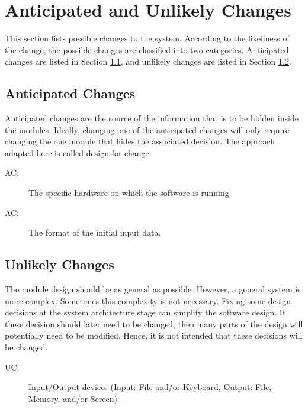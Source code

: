 \documentclass[12pt, titlepage]{article}
\newcounter{acnum}
\newcommand{\actheacnum}{AC\theacnum}
\newcounter{ucnum}
\newcommand{\uctheucnum}{UC\theucnum}
\begin{document}
\section{Anticipated and Unlikely Changes} \label{SecChange}

This section lists possible changes to the system. According to the likeliness
of the change, the possible changes are classified into two
categories. Anticipated changes are listed in Section \ref{SecAchange}, and
unlikely changes are listed in Section \ref{SecUchange}.

\subsection{Anticipated Changes} \label{SecAchange}

Anticipated changes are the source of the information that is to be hidden
inside the modules. Ideally, changing one of the anticipated changes will only
require changing the one module that hides the associated decision. The approach
adapted here is called design for
change.

\begin{description}
  \item[ \actheacnum \label{acHardware}:] The specific
    hardware on which the software is running.
  \item[ \actheacnum \label{acInput}:] The format of the
    initial input data.
\end{description}

\subsection{Unlikely Changes} \label{SecUchange}

The module design should be as general as possible. However, a general system is
more complex. Sometimes this complexity is not necessary. Fixing some design
decisions at the system architecture stage can simplify the software design. If
these decision should later need to be changed, then many parts of the design
will potentially need to be modified. Hence, it is not intended that these
decisions will be changed.

\begin{description}
  \item[ \uctheucnum \label{ucIO}:] Input/Output devices
    (Input: File and/or Keyboard, Output: File, Memory, and/or Screen).
\end{description}
\end{document}
